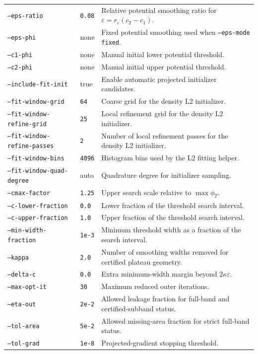\documentclass[11pt]{article}
\begin{document}
\begin{longtable}{>{\raggedright\arraybackslash}p{}
                  >{\raggedright\arraybackslash}p{}
                  >{\raggedright\arraybackslash}p{}}
\texttt{--eps-ratio} & \texttt{0.08} & Relative potential smoothing ratio for $\varepsilon=r_\varepsilon(c_2-c_1)$. \\
\texttt{--eps-phi} & none & Fixed potential smoothing used when \texttt{--eps-mode fixed}. \\
\texttt{--c1-phi} & none & Manual initial lower potential threshold. \\
\texttt{--c2-phi} & none & Manual initial upper potential threshold. \\
\texttt{--include-fit-init} & true & Enable automatic projected initializer candidates. \\
\texttt{--fit-window-grid} & \texttt{64} & Coarse grid for the density L2 initializer. \\
\texttt{--fit-window-refine-grid} & \texttt{25} & Local refinement grid for the density L2 initializer. \\
\texttt{--fit-window-refine-passes} & \texttt{2} & Number of local refinement passes for the density L2 initializer. \\
\texttt{--fit-window-bins} & \texttt{4096} & Histogram bins used by the L2 fitting helper. \\
\texttt{--fit-window-quad-degree} & auto & Quadrature degree for initializer sampling. \\
\texttt{--cmax-factor} & \texttt{1.25} & Upper search scale relative to $\max\phi_T$. \\
\texttt{--c-lower-fraction} & \texttt{0.0} & Lower fraction of the threshold search interval. \\
\texttt{--c-upper-fraction} & \texttt{1.0} & Upper fraction of the threshold search interval. \\
\texttt{--min-width-fraction} & \texttt{1e-3} & Minimum threshold width as a fraction of the search interval. \\
\texttt{--kappa} & \texttt{2.0} & Number of smoothing widths removed for certified plateau geometry. \\
\texttt{--delta-c} & \texttt{0.0} & Extra minimum-width margin beyond $2\kappa\varepsilon$. \\
\texttt{--max-opt-it} & \texttt{30} & Maximum reduced outer iterations. \\
\texttt{--eta-out} & \texttt{2e-2} & Allowed leakage fraction for full-band and certified-subband status. \\
\texttt{--tol-area} & \texttt{5e-2} & Allowed missing-area fraction for strict full-band status. \\
\texttt{--tol-grad} & \texttt{1e-8} & Projected-gradient stopping threshold. \\

\end{longtable}
\end{document}

